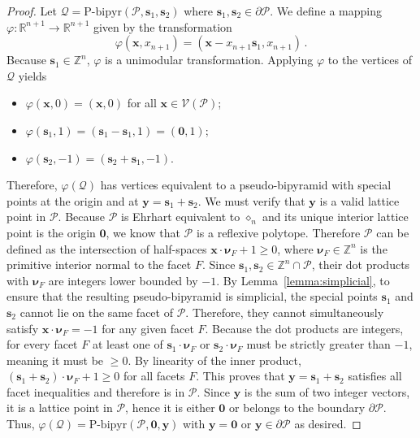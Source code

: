 \documentclass[a4paper,11pt,reqno]{amsart}
\newcommand{\Vv}{{\mathcal V}}
\newcommand{\Qq}{{\mathcal Q}}
\begin{document}
\begin{proof}
Let $\Qq = \text{P-bipyr}(\mathcal{P}, \bm{s}_1, \bm{s}_2)$ where $\bm{s}_1, \bm{s}_2 \in \partial \mathcal{P}$. 
We define a mapping $\varphi: \mathbb{R}^{n+1} \to \mathbb{R}^{n+1}$ given by the transformation
\[
\varphi(\bm{x}, x_{n+1}) = (\bm{x} - x_{n+1} \bm{s}_1, x_{n+1})\,.
\]
Because $\bm{s}_1 \in \mathbb{Z}^n$, $\varphi$ is a unimodular transformation. Applying $\varphi$ to the vertices 
of $\Qq$ yields
\begin{itemize}
\item $\varphi(\bm{x}, 0) = (\bm{x}, 0)$ for all $\bm{x} \in \Vv (\mathcal{P})$;
\item $\varphi(\bm{s}_1, 1) = (\bm{s}_1 - \bm{s}_1, 1) = (\bm{0}, 1)$;
\item $\varphi(\bm{s}_2, -1) = (\bm{s}_2 + \bm{s}_1, -1)$.
\end{itemize}
Therefore, $\varphi(\Qq)$ has vertices equivalent to a pseudo-bipyramid with special points at the origin and at 
$\bm{y} = \bm{s}_1 + \bm{s}_2$. We must verify that $\bm{y}$ is a valid lattice point in $\mathcal{P}$. 
Because $\mathcal{P}$ is Ehrhart equivalent to $\diamond_n$ and its unique interior lattice point is the origin $\bm{0}$, 
we know that $\mathcal{P}$ is a reflexive polytope. Therefore $\mathcal{P}$ can be defined as the intersection of 
half-spaces $\bm{x}\cdot\bm{\nu}_F +1 \geq 0$, where  $\bm{\nu}_F \in \mathbb{Z}^n$ is the primitive interior normal 
to the facet $F$. Since $\bm{s}_1, \bm{s}_2 \in \mathbb{Z}^n \cap \mathcal{P}$, their dot products with $\bm{\nu}_F$ 
are integers lower bounded by $-1$. By Lemma~\ref{lemma:simplicial}, to ensure that the resulting pseudo-bipyramid 
is simplicial, the special points $\bm{s}_1$ and $\bm{s}_2$ cannot lie on the same facet of $\mathcal{P}$. Therefore, 
they cannot simultaneously satisfy $\bm{x}\cdot\bm{\nu}_F = -1$ for any given facet $F$. Because the dot products 
are integers, for every facet $F$ at least one of $\bm{s}_1 \cdot \bm{\nu}_F$ or $\bm{s}_2 \cdot \bm{\nu}_F$ must be
strictly greater than $-1$, meaning it must be $\geq 0$. By linearity of the inner product,  
$(\bm{s}_1 + \bm{s}_2)\cdot \bm{\nu}_F + 1 \geq 0$ for all facets $F$. This proves that $\bm{y} = \bm{s}_1 + \bm{s}_2$ 
satisfies all facet inequalities and therefore is in $\mathcal{P}$. Since $\bm{y}$ is the sum of two integer vectors, it is 
a lattice point in $\mathcal{P}$, hence it is either $\bm{0}$ or belongs to the boundary $\partial \mathcal{P}$. 
Thus, $\varphi(\Qq) = \text{P-bipyr}(\mathcal{P}, \bm{0}, \bm{y})$ with $\bm{y} = \bm{0}$ or $\bm{y} \in \partial \mathcal{P}$
as desired.
\end{proof}
\end{document}

